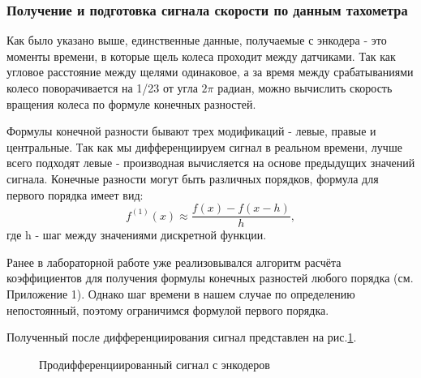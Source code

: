 \documentclass[14pt,a4paper,russian]{scrartcl}
\begin{document}
\subsubsection{Получение и подготовка сигнала скорости по данным тахометра}
Как было указано выше, единственные данные, получаемые с энкодера - это
моменты времени, в которые щель колеса проходит между датчиками.
Так как угловое расстояние между щелями одинаковое, а за время между срабатываниями
колесо поворачивается на 1/23 от угла \(2\pi\) радиан, можно вычислить скорость
вращения колеса по формуле конечных разностей.

Формулы конечной разности бывают трех модификаций - левые, правые и центральные. Так как
мы дифференциируем сигнал в реальном времени, лучше всего подходят левые - производная
вычисляется на основе предыдущих значений сигнала. Конечные разности могут быть
различных порядков, формула для первого порядка имеет вид:
\[ f^{(1)}(x) \approx \frac{f(x)-f(x-h)}{h}, \]
где h - шаг между значениями дискретной функции.

Ранее в лабораторной работе уже реализовывался алгоритм расчёта коэффициентов
для получения формулы конечных разностей любого порядка (см. Приложение 1). Однако шаг времени
в нашем случае по определению непостоянный, поэтому ограничимся формулой первого порядка.

Полученный после дифференциирования сигнал представлен на рис.\ref{fig:pure_speed}.
\begin{figure}[h]
    \caption{Продифференциированный сигнал с энкодеров}
    \label{fig:pure_speed}
\end{figure}
\end{document}
